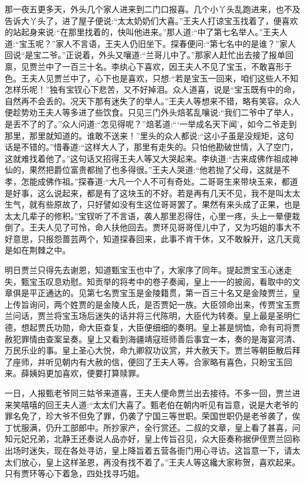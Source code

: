 \begin{parag}
    那一夜五更多天，外头几个家人进来到二门口报喜。几个小丫头乱跑进来，也不及告诉大丫头了，进了屋子便说:“太太奶奶们大喜。”王夫人打谅宝玉找着了，便喜欢的站起身来说:“在那里找着的，快叫他进来。”那人道:“中了第七名举人。”王夫人道:“宝玉呢？”家人不言语，王夫人仍旧坐下。探春便问:“第七名中的是谁？”家人回说“是宝二爷。”正说着，外头又嚷道:“兰哥儿中了。”那家人赶忙出去接了报单回禀，见贾兰中了一百三十名。李纨心下喜欢，因王夫人不见了宝玉，不敢喜形于色。王夫人见贾兰中了，心下也是喜欢，只想:“若是宝玉一回来，咱们这些人不知怎样乐呢！”独有宝钗心下悲苦，又不好掉泪。众人道喜，说是“宝玉既有中的命，自然再不会丢的。况天下那有迷失了的举人。”王夫人等想来不错，略有笑容。众人便趁势劝王夫人等多进了些饮食。只见三门外头焙茗乱嚷说:“我们二爷中了举人，是丢不了的了。”众人问道:“怎见得呢？”焙茗道:“‘一举成名天下闻’，如今二爷走到那里，那里就知道的。谁敢不送来！”里头的众人都说:“这小子虽是没规矩，这句话是不错的。”惜春道:“这样大人了，那里有走失的。只怕他勘破世情，入了空门，这就难找着他了。”这句话又招得王夫人等又大哭起来。李纨道:“古来成佛作祖成神仙的，果然把爵位富贵都抛了也多得很。”王夫人哭道:“他若抛了父母，这就是不孝，怎能成佛作祖。”探春道:“大凡一个人不可有奇处。二哥哥生来带块玉来，都道是好事，这么说起来，都是有了这块玉的不好。若是再有几天不见，我不是叫太太生气，就有些原故了，只好譬如没有生这位哥哥罢了。果然有来头成了正果，也是太太几辈子的修积。”宝钗听了不言语，袭人那里忍得住，心里一疼，头上一晕便栽倒了。王夫人见了可怜，命人扶他回去。贾环见哥哥侄儿中了，又为巧姐的事大不好意思，只报怨蔷芸两个，知道探春回来，此事不肯干休，又不敢躲开，这几天竟是如在荆棘之中。
\end{parag}


\begin{parag}
    明日贾兰只得先去谢恩，知道甄宝玉也中了，大家序了同年。提起贾宝玉心迷走失，甄宝玉叹息劝慰。知贡举的将考中的卷子奏闻，皇上一一的披阅，看取中的文章俱是平正通达的。见第七名贾宝玉是金陵籍贯，第一百三十名又是金陵贾兰，皇上传旨询问，两个姓贾的是金陵人氏，是否贾妃一族。大臣领命出来，传贾宝玉贾兰问话，贾兰将宝玉场后迷失的话并将三代陈明，大臣代为转奏。皇上最是圣明仁德，想起贾氏功勋，命大臣查复，大臣便细细的奏明。皇上甚是悯恤，命有司将贾赦犯罪情由查案呈奏。皇上又看到海疆靖寇班师善后事宜一本，奏的是海宴河清、万民乐业的事。皇上圣心大悦，命九卿叙功议赏，并大赦天下。贾兰等朝臣散后拜了座师，并听见朝内有大赦的信，便回了王夫人等。合家略有喜色，只盼宝玉回来。薛姨妈更加喜欢，便要打算赎罪。
\end{parag}


\begin{parag}
    一日，人报甄老爷同三姑爷来道喜，王夫人便命贾兰出去接待。不多一回，贾兰进来笑嘻嘻的回王夫人道:“太太们大喜了。甄老伯在朝内听见有旨意，说是大老爷的罪名免了，珍大爷不但免了罪，仍袭了宁国三等世职。荣国世职仍是老爷袭了，俟丁忧服满，仍升工部郎中。所抄家产，全行赏还。二叔的文章，皇上看了甚喜，问知元妃兄弟，北静王还奏说人品亦好，皇上传旨召见，众大臣奏称据伊侄贾兰回称出场时迷失，现在各处寻访，皇上降旨着五营各衙门用心寻访。这旨意一下，请太太们放心，皇上这样圣恩，再没有找不着了。”王夫人等这纔大家称贺，喜欢起来。只有贾环等心下着急，四处找寻巧姐。
\end{parag}


